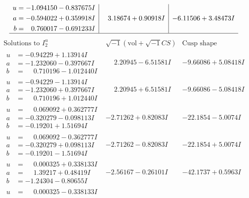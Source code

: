 \documentclass[1p]{elsarticle_modified}
\theoremstyle{definition}
\newcommand{\I}{\sqrt{-1}}
\begin{document}
$$\begin{array}{c|c|c}
\begin{aligned}
u &= -1.094150 - 0.837675 I \\
a &= -0.594022 + 0.359918 I \\
b &= \phantom{-}0.760017 - 0.691233 I\end{aligned}
 & \phantom{-}3.18674 + 0.90918 I & -6.11506 + 3.48473 I\\
 \hline 
 \end{array}$$\newpage$$\begin{array}{c|c|c}  
\text{Solutions to }I^u_{2}& \I (\text{vol} + \sqrt{-1}CS) & \text{Cusp shape}\\
 \hline 
\begin{aligned}
u &= -0.94229 + 1.13914 I \\
a &= -1.232060 - 0.397667 I \\
b &= \phantom{-}0.710196 - 1.012440 I\end{aligned}
 & \phantom{-}2.20945 - 6.51581 I & -9.66086 + 5.08418 I \\ \hline\begin{aligned}
u &= -0.94229 - 1.13914 I \\
a &= -1.232060 + 0.397667 I \\
b &= \phantom{-}0.710196 + 1.012440 I\end{aligned}
 & \phantom{-}2.20945 + 6.51581 I & -9.66086 - 5.08418 I \\ \hline\begin{aligned}
u &= \phantom{-}0.069092 + 0.362777 I \\
a &= -0.320279 - 0.098113 I \\
b &= -0.19201 + 1.51694 I\end{aligned}
 & -2.71262 + 0.82083 I & -22.1854 - 5.0074 I \\ \hline\begin{aligned}
u &= \phantom{-}0.069092 - 0.362777 I \\
a &= -0.320279 + 0.098113 I \\
b &= -0.19201 - 1.51694 I\end{aligned}
 & -2.71262 - 0.82083 I & -22.1854 + 5.0074 I \\ \hline\begin{aligned}
u &= \phantom{-}0.000325 + 0.338133 I \\
a &= \phantom{-}1.39217 + 0.48419 I \\
b &= -1.24304 - 0.80655 I\end{aligned}
 & -2.56167 - 0.26101 I & -42.1737 + 0.5963 I \\ \hline\begin{aligned}
u &= \phantom{-}0.000325 - 0.338133 I \\

\end{aligned}
\end{array}$$
\end{document}
